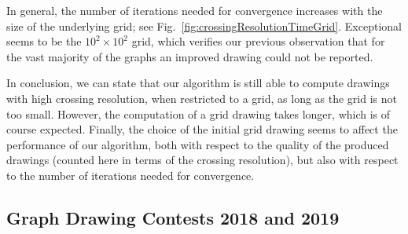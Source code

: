 \documentclass{comjnl}
\begin{document}
In general, the number of iterations needed for convergence increases with the size of the underlying grid; see Fig.~\ref{fig:crossingResolutionTimeGrid}. Exceptional seems to be the $10^2 \times 10^2$ grid, which verifies our previous observation that for the vast majority of the graphs an improved drawing could not be reported.

In conclusion, we can state that our algorithm is still able to compute drawings with high crossing resolution, when restricted to a grid, as long as the grid is not too small. However, the computation of a grid drawing takes longer, which is of course expected. Finally, the choice of the initial grid drawing seems to affect the performance of our algorithm, both with respect to the quality of the produced drawings (counted here in terms of the crossing resolution), but also with respect to the number of iterations needed for convergence.

\subsection{Graph Drawing Contests 2018 and 2019}
\label{ssec:contest}
\end{document}

